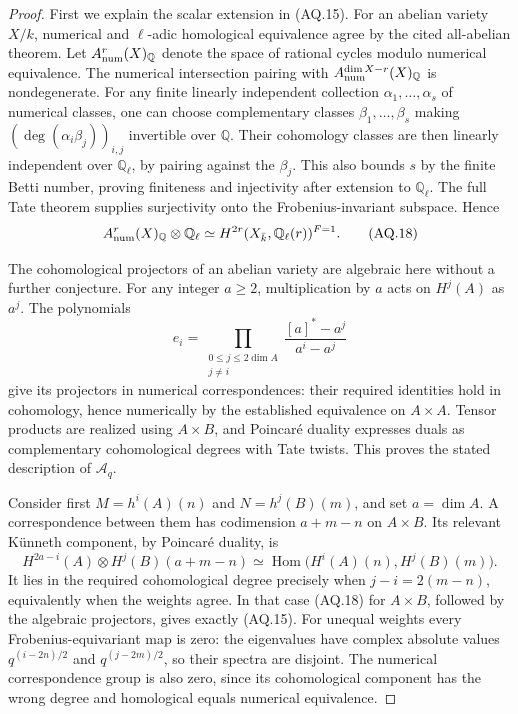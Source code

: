 \begin{proof}
First we explain the scalar extension in (AQ.15).
For an abelian variety $X/k$, numerical and
$\ell$-adic homological equivalence agree by the
cited all-abelian theorem. Let $A^r_{\rm num}(X)_{\mathbb Q}$
denote the space of rational cycles modulo numerical
equivalence. The numerical intersection pairing
with $A^{\dim X-r}_{\rm num}(X)_{\mathbb Q}$ is nondegenerate.
For any finite linearly independent collection
$\alpha_1,\ldots,\alpha_s$ of numerical classes,
one can choose complementary classes
$\beta_1,\ldots,\beta_s$ making
$(\deg(\alpha_i\beta_j))_{i,j}$ invertible over
$\mathbb Q$. Their cohomology classes are then
linearly independent over $\mathbb Q_\ell$, by
pairing against the $\beta_j$. This also bounds
$s$ by the finite Betti number, proving finiteness
and injectivity after extension to $\mathbb Q_\ell$.
The full Tate theorem supplies surjectivity onto
the Frobenius-invariant subspace. Hence
\[
 A^r_{\rm num}(X)_{\mathbb Q}\otimes\mathbb Q_\ell
 \simeq H^{2r}(X_{\bar k},\mathbb Q_\ell(r))^{F=1}.
                                                               \tag{AQ.18}
\]

The cohomological projectors of an abelian variety
are algebraic here without a further conjecture.
For any integer $a\geq2$, multiplication by $a$
acts on $H^j(A)$ as $a^j$. The polynomials
\[
 e_i=\prod_{\substack{0\leq j\leq2\dim A\\j\ne i}}
       \frac{[a]^*-a^j}{a^i-a^j}
\]
give its projectors in numerical correspondences:
their required identities hold in cohomology,
hence numerically by the established equivalence
on $A\times A$. Tensor products are realized
using $A\times B$, and Poincar\'e duality expresses
duals as complementary cohomological degrees
with Tate twists. This proves the stated description
of $\mathcal A_q$.

Consider first $M=h^i(A)(n)$ and $N=h^j(B)(m)$,
and set $a=\dim A$. A correspondence between them
has codimension $a+m-n$ on $A\times B$. Its
relevant K\"unneth component, by Poincar\'e duality,
is
\[
 H^{2a-i}(A)\otimes H^j(B)(a+m-n)
 \simeq\operatorname{Hom}\bigl(H^i(A)(n),H^j(B)(m)\bigr).
\]
It lies in the required cohomological degree
precisely when $j-i=2(m-n)$, equivalently when
the weights agree. In that case (AQ.18) for
$A\times B$, followed by the algebraic projectors,
gives exactly (AQ.15). For unequal weights every
Frobenius-equivariant map is zero: the eigenvalues
have complex absolute values $q^{(i-2n)/2}$ and
$q^{(j-2m)/2}$, so their spectra are disjoint.
The numerical correspondence group is also zero,
since its cohomological component has the wrong
degree and homological equals numerical equivalence.


\end{proof}
